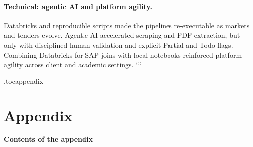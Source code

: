 \documentclass{article}
\begin{document}
\vspace{0.4em}

\paragraph{Technical: agentic AI and platform agility.}
Databricks and reproducible scripts made the pipelines re-executable as markets and tenders evolve. Agentic AI accelerated scraping and PDF extraction, but only with disciplined human validation and explicit Partial and Todo flags. Combining Databricks for SAP joins with local notebooks reinforced platform agility across client and academic settings.
```

\clearpage

\appendix
\etocdepthtag.toc{appendix}

\section*{Appendix}

\vspace{0.5em}
{\large\bfseries Contents of the appendix\par}
\vspace{0.25em}
\tableofcontents
\end{document}
